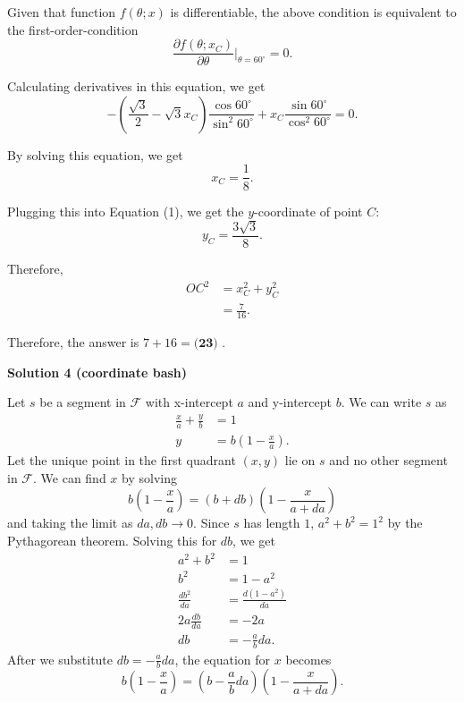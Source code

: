 \begin{enumerate}
 Given that function $f \left( \theta ; x \right)$ is differentiable, the above condition is equivalent to the first-order-condition
 \[ \frac{\partial f \left( \theta ; x_C \right) }{\partial \theta} \bigg|_{\theta = 60^\circ} = 0 . \]

 Calculating derivatives in this equation, we get
 \[ - \left( \frac{\sqrt{3}}{2} - \sqrt{3} x_C \right) \frac{\cos 60^\circ}{\sin^2 60^\circ} + x_C \frac{\sin 60^\circ}{\cos^2 60^\circ} = 0. \]

 By solving this equation, we get
 \[ x_C = \frac{1}{8} . \]

 Plugging this into Equation (1), we get the $y$-coordinate of point $C$:
 \[ y_C = \frac{3 \sqrt{3}}{8} . \]

 Therefore,\begin{align*}OC^2 & = x_C^2 + y_C^2 \\& = \frac{7}{16} .\end{align*}


 Therefore, the answer is $7 + 16 = \boxed{\textbf{(23) }}$.

 



\textbf{Solution 4 (coordinate bash)}

Let $s$ be a segment in $\mathcal{F}$ with x-intercept $a$ and y-intercept $b$. We can write $s$ as\begin{align*}\frac{x}{a} + \frac{y}{b} &= 1 \\y &= b(1 - \frac{x}{a}).\end{align*}
Let the unique point in the first quadrant $(x, y)$ lie on $s$ and no other segment in $\mathcal{F}$. We can find $x$ by solving
 \[b(1 - \frac{x}{a}) = (b + db)(1 - \frac{x}{a + da})\]and taking the limit as $da, db \to 0$. Since $s$ has length $1$, $a^2 + b^2 = 1^2$ by the Pythagorean theorem. Solving this for $db$, we get\begin{align*}a^2 + b^2 &= 1 \\b^2 &= 1 - a^2 \\\frac{db^2}{da} &= \frac{d(1 - a^2)}{da} \\2a\frac{db}{da} &= -2a \\db &= -\frac{a}{b}da.\end{align*}
After we substitute $db = -\frac{a}{b}da$, the equation for $x$ becomes
 \[b(1 - \frac{x}{a}) = (b -\frac{a}{b} da)(1 - \frac{x}{a + da}).\]


\end{enumerate}
